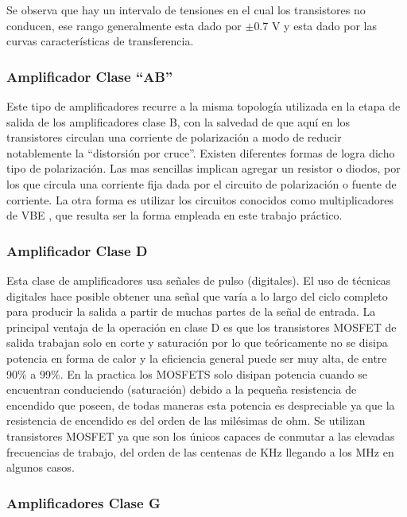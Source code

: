 \documentclass[a4paper,12pt,twoside]{article}
\begin{document}
Se observa que hay un intervalo de tensiones en el cual los transistores no conducen, ese rango generalmente esta dado por $\pm$0.7 V y esta dado por las curvas características de transferencia.

\medskip 
\subsubsection*{Amplificador Clase “AB”}


 Este tipo de amplificadores recurre a la misma topología utilizada en la etapa de salida de los amplificadores clase B, con la salvedad de que aquí en los transistores circulan una corriente de polarización a modo de reducir notablemente la “distorsión por cruce”.
 Existen diferentes formas de logra dicho tipo de polarización. Las mas sencillas implican agregar un resistor o diodos, por los que circula una corriente fija dada por el circuito de polarización o fuente de corriente. La otra forma es utilizar los circuitos conocidos como multiplicadores de VBE , que resulta ser la forma empleada en este trabajo práctico.


\medskip 
\subsubsection*{Amplificador Clase D}

Esta clase de amplificadores usa señales de pulso (digitales). El uso de técnicas digitales hace posible obtener una señal que varía a lo largo del ciclo completo para producir la salida a partir de muchas partes de la señal de entrada. La principal ventaja de la operación en clase D es que los transistores MOSFET de salida trabajan solo en corte y saturación por lo que teóricamente no se disipa potencia en forma de calor y la eficiencia general puede ser muy alta, de entre 90\% a 99\%. En la practica los MOSFETS solo disipan potencia cuando se encuentran conduciendo (saturación) debido a la pequeña resistencia de encendido que poseen, de todas maneras esta potencia es despreciable ya que la resistencia de encendido es del orden de las milésimas de ohm. Se utilizan transistores MOSFET ya que son los únicos capaces de conmutar a las elevadas frecuencias de trabajo, del orden de las centenas de KHz llegando a los MHz en algunos casos.

\newpage

\subsubsection*{Amplificadores Clase G}
\end{document}
